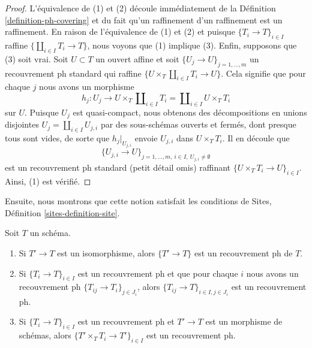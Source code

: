 \begin{proof}
L'équivalence de (1) et (2) découle immédiatement de la Définition \ref{definition-ph-covering} et du fait qu'un raffinement d'un raffinement est un raffinement. En raison de l'équivalence de (1) et (2) et puisque $\{T_i \to T\}_{i \in I}$ raffine $\{\coprod_{i \in I} T_i \to T\}$, nous voyons que (1) implique (3). Enfin, supposons que (3) soit vrai. Soit $U \subset T$ un ouvert affine et soit $\{U_j \to U\}_{j = 1, \ldots, m}$ un recouvrement ph standard qui raffine $\{U \times_T \coprod_{i \in I} T_i \to U\}$. Cela signifie que pour chaque $j$ nous avons un morphisme
$$
h_j :
U_j
\longrightarrow
U \times_T \coprod\nolimits_{i \in I} T_i =
\coprod\nolimits_{i \in I} U \times_T T_i
$$
sur $U$. Puisque $U_j$ est quasi-compact, nous obtenons des décompositions en unions disjointes $U_j = \coprod_{i \in I} U_{j, i}$ par des sous-schémas ouverts et fermés, dont presque tous sont vides, de sorte que $h_j|_{U_{j, i}}$ envoie $U_{j, i}$ dans $U \times_T T_i$. Il en découle que
$$
\{U_{j, i} \to U\}_{j = 1, \ldots, m,\ i \in I,\ U_{j, i} \not = \emptyset}
$$
est un recouvrement ph standard (petit détail omis) raffinant $\{U \times_T T_i \to U\}_{i \in I}$. Ainsi, (1) est vérifié.
\end{proof}


\noindent
Ensuite, nous montrons que cette notion satisfait les conditions de Sites, Définition \ref{sites-definition-site}.

\begin{lemma}
\label{lemma-ph}
Soit $T$ un schéma.
\begin{enumerate}
\item Si $T' \to T$ est un isomorphisme, alors $\{T' \to T\}$ est un recouvrement ph de $T$.
\item Si $\{T_i \to T\}_{i\in I}$ est un recouvrement ph et que pour chaque $i$ nous avons un recouvrement ph $\{T_{ij} \to T_i\}_{j\in J_i}$, alors $\{T_{ij} \to T\}_{i \in I, j\in J_i}$ est un recouvrement ph.
\item Si $\{T_i \to T\}_{i\in I}$ est un recouvrement ph et $T' \to T$ est un morphisme de schémas, alors $\{T' \times_T T_i \to T'\}_{i\in I}$ est un recouvrement ph.
\end{enumerate}
\end{lemma}

